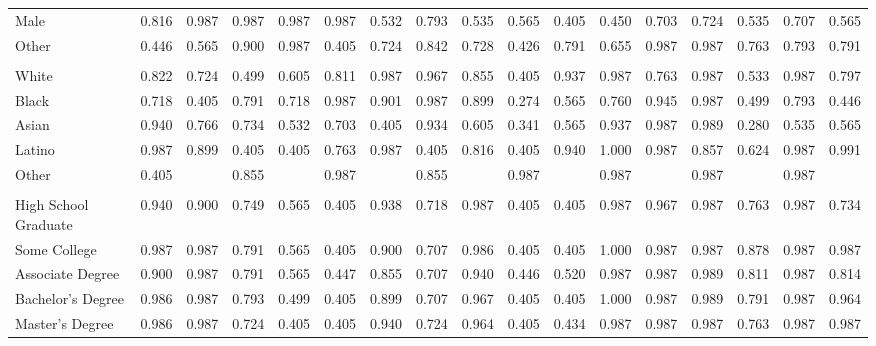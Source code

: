 \documentclass[11pt]{report}
\begin{document}
\begin{append}
\begin{table}[ht]
\begin{tabular}{@{\extracolsep{-4pt}}lcccccccccccccccc}
    \midrule
    \addlinespace[2.5pt]
    \multicolumn{17}{l}{\textbf{Gender}} \\ 
    \midrule
    Male & 0.816 & 0.987 & 0.987 & 0.987 & 0.987 & 0.532 & 0.793 & 0.535 & 0.565 & 0.405 & 0.450 & 0.703 & 0.724 & 0.535 & 0.707 & 0.565 \\ 
    Other & 0.446 & 0.565 & 0.900 & 0.987 & 0.405 & 0.724 & 0.842 & 0.728 & 0.426 & 0.791 & 0.655 & 0.987 & 0.987 & 0.763 & 0.793 & 0.791 \\ 
    \midrule
    \addlinespace[2.5pt]
    \multicolumn{17}{l}{\textbf{Race}} \\ 
    \midrule
    White & 0.822 & 0.724 & 0.499 & 0.605 & 0.811 & 0.987 & 0.967 & 0.855 & 0.405 & 0.937 & 0.987 & 0.763 & 0.987 & 0.533 & 0.987 & 0.797 \\ 
    Black & 0.718 & 0.405 & 0.791 & 0.718 & 0.987 & 0.901 & 0.987 & 0.899 & 0.274 & 0.565 & 0.760 & 0.945 & 0.987 & 0.499 & 0.793 & 0.446 \\ 
    Asian & 0.940 & 0.766 & 0.734 & 0.532 & 0.703 & 0.405 & 0.934 & 0.605 & 0.341 & 0.565 & 0.937 & 0.987 & 0.989 & 0.280 & 0.535 & 0.565 \\ 
    Latino & 0.987 & 0.899 & 0.405 & 0.405 & 0.763 & 0.987 & 0.405 & 0.816 & 0.405 & 0.940 & 1.000 & 0.987 & 0.857 & 0.624 & 0.987 & 0.991 \\ 
    Other & 0.405 &  & 0.855 &  & 0.987 &  & 0.855 &  & 0.987 &  & 0.987 &  & 0.987 &  & 0.987 &  \\ 
    \midrule
    \addlinespace[2.5pt]
    \multicolumn{17}{l}{\textbf{Education Level}} \\ 
    \midrule
    High School Graduate & 0.940 & 0.900 & 0.749 & 0.565 & 0.405 & 0.938 & 0.718 & 0.987 & 0.405 & 0.405 & 0.987 & 0.967 & 0.987 & 0.763 & 0.987 & 0.734 \\ 
    Some College & 0.987 & 0.987 & 0.791 & 0.565 & 0.405 & 0.900 & 0.707 & 0.986 & 0.405 & 0.405 & 1.000 & 0.987 & 0.987 & 0.878 & 0.987 & 0.987 \\ 
    Associate Degree & 0.900 & 0.987 & 0.791 & 0.565 & 0.447 & 0.855 & 0.707 & 0.940 & 0.446 & 0.520 & 0.987 & 0.987 & 0.989 & 0.811 & 0.987 & 0.814 \\ 
    Bachelor's Degree & 0.986 & 0.987 & 0.793 & 0.499 & 0.405 & 0.899 & 0.707 & 0.967 & 0.405 & 0.405 & 1.000 & 0.987 & 0.989 & 0.791 & 0.987 & 0.964 \\ 
    Master's Degree & 0.986 & 0.987 & 0.724 & 0.405 & 0.405 & 0.940 & 0.724 & 0.964 & 0.405 & 0.434 & 0.987 & 0.987 & 0.987 & 0.763 & 0.987 & 0.987 \\ 

\end{tabular}
\end{table}
\end{append}
\end{document}
